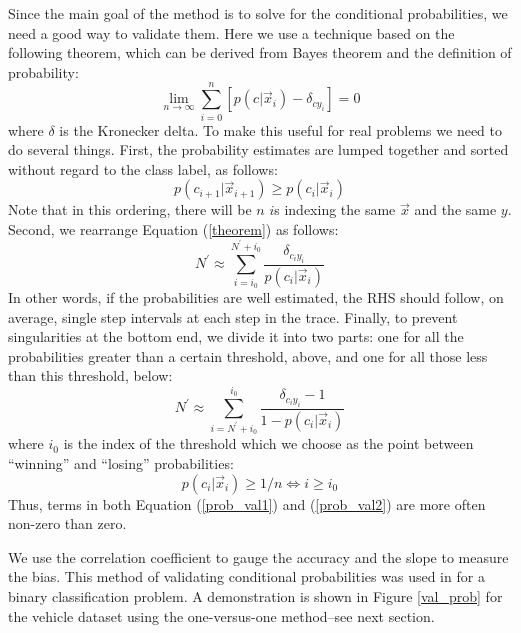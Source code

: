 Since the main goal of the method 
is to solve for the conditional probabilities, 
we need a good way to validate them. 
Here we use a technique based on the
following theorem, which can be derived from Bayes theorem and the 
definition of probability:
\begin{equation}
	\lim_{n \rightarrow \infty} \sum_{i=0}^{n} \left [
	p(c | \vec x_i) - \delta_{cy_i} \right ] = 0
	\label{theorem}
\end{equation}
where $\delta$ is the Kronecker delta.
To make this useful for real problems we need to do several things.
First, the probability estimates are lumped together and sorted without regard
to the class label, as follows:
\begin{equation}
	p(c_{i+1} | \vec x_{i+1}) \ge p(c_i | \vec x_i)
\end{equation}
Note that in this ordering, there will be $n$ $i$s indexing the same $\vec x$ 
and the same $y$.
Second, we rearrange Equation (\ref{theorem}) as follows:
\begin{equation}
	N^\prime \approx \sum_{i=i_0}^{N^\prime+i_0} \frac{\delta_{c_i y_i}}{p(c_i | \vec x_i)}
	\label{prob_val1}
\end{equation}
In other words, if the probabilities are well estimated, the RHS should
follow, on average, single step intervals at each step in the trace.
Finally, to prevent singularities at the bottom end, 
we divide it into two parts:
one for all the probabilities greater than a certain threshold, above, 
and one for all those less than this threshold, below:
\begin{equation}
	N^\prime  \approx \sum_{i=N^\prime+i_0}^{i_0} \frac{\delta_{c_i y_i} - 1}{1 - p(c_i | \vec x_i)}
	\label{prob_val2}
\end{equation}
where $i_0$ is the index of the threshold which we choose as the
point between ``winning'' and ``losing'' probabilities:
\begin{equation}
	p(c_i | \vec x_i) \ge 1/n \iff i \ge i_0
\end{equation}
Thus, terms in both Equation (\ref{prob_val1}) and (\ref{prob_val2}) are more
often non-zero than zero.

We use the correlation coefficient to gauge the accuracy and the slope to
measure the bias.
This method of validating conditional probabilities was used in
\citet{Mills2009} for a binary classification problem.
A demonstration is shown in Figure \ref{val_prob}
for the vehicle dataset using the one-versus-one method--see next section.

